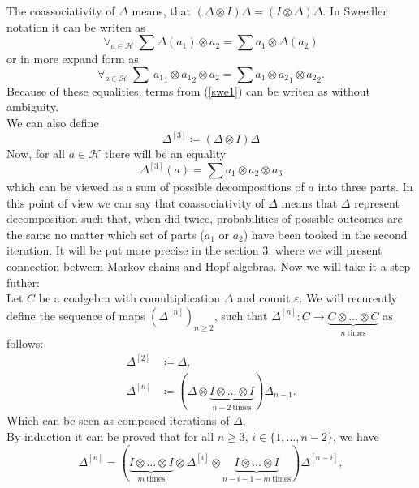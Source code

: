\documentclass[a4paper]{article}
\begin{document}
The coassociativity of $\Delta$ means, that $(\Delta \otimes I)\Delta = (I \otimes \Delta)\Delta$.
In Sweedler notation it can be writen as
\begin{equation*}
\forall_{a \in \mathcal{H}}\ \sum\Delta(a_1) \otimes a_2 = \sum a_1 \otimes \Delta(a_2)
\end{equation*}
or in more expand form as
\begin{equation}\label{swe1}
\forall_{a\in \mathcal{H}}\ \sum\ {a_1}_1 \otimes {a_1}_2 \otimes a_2 = \sum a_1 \otimes {a_2}_1
\otimes {a_2}_2.
\end{equation}
Because of these equalities, terms from (\ref{swe1}) can be writen as
 without ambiguity. \\
We can also define
\begin{equation*}
\Delta^{[3]} \coloneqq (\Delta \otimes I)\Delta
\end{equation*}
Now, for all $a \in \mathcal{H}$ there will be an equality
\begin{equation*}
\Delta^{[3]}(a) = \sum a_1 \otimes a_2 \otimes a_3
\end{equation*}
which can be viewed as a sum of possible decompositions of $a$ into three parts.
In this point of view we can say that coassociativity of $\Delta$ means that $\Delta$ represent
decomposition such that, when did twice, probabilities of possible outcomes are the same
no matter which set of parts ($a_1$ or $a_2$) have been tooked in the second iteration. It will be put more
precise in the section 3. where we will present connection between Markov chains and Hopf algebras.
Now we will take it a step futher: \\[8pt]
\indent Let $C$ be a coalgebra with comultiplication $\Delta$ and counit $\varepsilon$.
We will recurently define the sequence of maps $(\Delta^{[n]})_{n \geq 2}$, such that
$\Delta^{[n]} : C \to \underbrace{C \otimes \dots \otimes C}_{n \mathrm{\ times}}$ as follows:
\begin{align*}
\Delta^{[2]} &\coloneqq \Delta, \\
\Delta^{[n]} &\coloneqq (\Delta \otimes
\underbrace{I \otimes \dots \otimes I}_{n - 2 \mathrm{\ times}})\Delta_{n-1}.
\end{align*}
Which can be seen as composed iterations of $\Delta$. \\
By induction it can be proved that for all $n \geq 3$, $i \in \{1, \dots, n-2\}$,
 we have
\begin{equation*}
\Delta^{[n]} = (\underbrace{I \otimes \dots \otimes I}_{m\ \mathrm{times}} \otimes
\Delta^{[i]} \otimes \underbrace{I \otimes \dots \otimes I}_{n-i-1-m \mathrm{\ times}})\Delta^{[n-i]},
\end{equation*}
\end{document}
